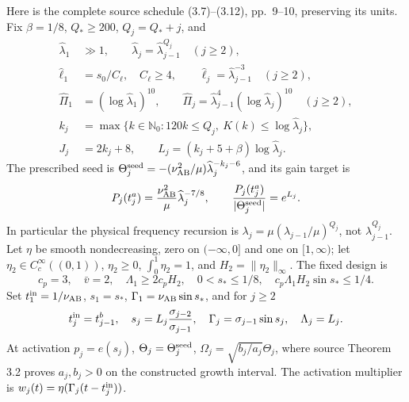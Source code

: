 Here is the complete source schedule (3.7)--(3.12), pp.~9--10, preserving its units. Fix $\beta=1/8$, $Q_*\ge200$, $Q_j=Q_*+j$, and
\begin{align}
 \widehat\lambda_1&\gg1,\qquad\widehat\lambda_j=\widehat\lambda_{j-1}^{Q_j}\quad(j\ge2),\label{cvlane:pc:eq:schedule}\\
 \widehat\ell_1&=s_0/C_\ell,\quad C_\ell\ge4,\qquad\widehat\ell_j=\widehat\lambda_{j-1}^{-3}\quad(j\ge2),\nonumber\\
 \widehat\Pi_1&=(\log\widehat\lambda_1)^{10},\qquad
 \widehat\Pi_j=\widehat\lambda_{j-1}^{4}(\log\widehat\lambda_j)^{10}\quad(j\ge2),\nonumber\\
 k_j&=\max\{k\in\mathbb N_0:120k\le Q_j,\ K(k)\le\log\widehat\lambda_j\},\nonumber\\
 J_j&=2k_j+8,\qquad L_j=(k_j+5+\beta)\log\widehat\lambda_j.\nonumber
\end{align}
The prescribed seed is $\Theta_j^{\rm seed}=-(\nu_{\mathrm{AB}}^2/\mu)\widehat\lambda_j^{-k_j-6}$, and its gain target is
\[
 P_j(t_j^a)=\frac{\nu_{\mathrm{AB}}^2}{\mu}\widehat\lambda_j^{-7/8},
 \qquad \frac{P_j(t_j^a)}{|\Theta_j^{\rm seed}|}=e^{L_j}.
\]
In particular the physical frequency recursion is $\lambda_j=\mu(\lambda_{j-1}/\mu)^{Q_j}$, not $\lambda_{j-1}^{Q_j}$.
Let $\eta$ be smooth nondecreasing, zero on $(-\infty,0]$ and one on $[1,\infty)$; let $\eta_2\in C_c^\infty((0,1))$, $\eta_2\ge0$, $\int_0^1\eta_2=1$, and $H_2=\|\eta_2\|_\infty$. The fixed design is
\[
 c_p=3,\quad\bar v=2,\quad\Lambda_1\ge2c_pH_2,\quad
 0<s_*\le1/8,\quad c_p\Lambda_1H_2\sin s_*\le1/4.
\]
Set $t_1^{\rm in}=1/\nu_{\mathrm{AB}}$, $s_1=s_*$, $\Gamma_1=\nu_{\mathrm{AB}}\sin s_*$, and for $j\ge2$
\[
 t_j^{\rm in}=t_{j-1}^b,\quad s_j=L_j\frac{\sigma_{j-2}}{\sigma_{j-1}},\quad
 \Gamma_j=\sigma_{j-1}\sin s_j,\quad\Lambda_j=L_j.
\]
At activation $p_j=e(s_j)$, $\Theta_j=\Theta_j^{\rm seed}$, $\Omega_j=\sqrt{b_j/a_j}\Theta_j$, where source Theorem 3.2 proves $a_j,b_j>0$ on the constructed growth interval. The activation multiplier is $w_j(t)=\eta(\Gamma_j(t-t_j^{\rm in}))$.
